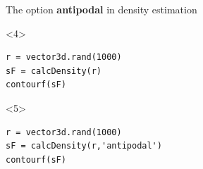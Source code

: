 \documentclass[compress]{beamer}
\begin{document}
\begin{frame}[fragile]
\begin{columns}
\begin{column}{8.5cm}
\begin{overlayarea}{8.5cm}{8cm}
The option \textbf{antipodal} in density estimation
\begin{onlyenv}<4>
\begin{lstlisting}[style=input]
r = vector3d.rand(1000)
sF = calcDensity(r)
contourf(sF)
\end{lstlisting}
\end{onlyenv}
\begin{onlyenv}<5>
  \begin{lstlisting}[style=input]
r = vector3d.rand(1000)
sF = calcDensity(r,'antipodal')
contourf(sF)
\end{lstlisting}
\end{onlyenv}
\end{overlayarea}
\end{column}
  \begin{column}{3.5cm}
  \end{column}
\end{columns}



\end{frame}
\end{document}
